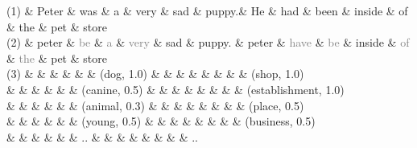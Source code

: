 \begin{dependency}
        \begin{deptext}[column sep=0.1em, row  sep=0.2em]
            (1) \&
            Peter \&
            was \&
            a \&
            very \&
            sad \&
            puppy.\&
            He \&
            had \&
            been \&
            inside \&
            of \&
            the \&
            pet \&
            store \\ \hline
            (2) \&
            peter \&
            \textcolor{grey}{be} \&
            \textcolor{grey}{a} \&
            \textcolor{grey}{very} \&
            sad \&
            puppy. \&
            peter \&
            \textcolor{grey}{have} \&
            \textcolor{grey}{be} \&
            inside \&
            \textcolor{grey}{of} \&
            \textcolor{grey}{the} \&
            pet \&
            store  \\ \hline
            (3) \&
             \&
             \&
             \&
             \&
             \&
            (dog, 1.0) \&
             \&
             \&
             \&
             \&
             \&
             \&
            \&
            (shop, 1.0)  \\
            \&
             \&
             \&
             \&
             \&
             \&
            (canine, 0.5) \&
             \&
             \&
             \&
             \&
             \&
             \&
            \&
            (establishment, 1.0)  \\
            \&
             \&
             \&
             \&
             \&
             \&
            (animal, 0.3) \&
             \&
             \&
             \&
             \&
             \&
             \&
            \&
            (place, 0.5)  \\
            \&
             \&
             \&
             \&
             \&
             \&
            (young, 0.5) \&
             \&
             \&
             \&
             \&
             \&
             \&
            \&
            (business, 0.5)  \\
            \&
             \&
             \&
             \&
             \&
             \&
            .. \&
             \&
             \&
             \&
             \&
             \&
             \&
            \&
            ..  \\
        \end{deptext}
    \end{dependency}
